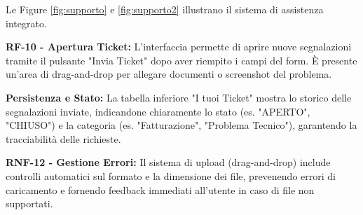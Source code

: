 Le Figure \ref{fig:supporto} e \ref{fig:supporto2} illustrano il sistema di assistenza integrato.

\textbf{RF-10 - Apertura Ticket:}
L'interfaccia permette di aprire nuove segnalazioni tramite il pulsante "Invia Ticket" dopo aver riempito i campi del form. È presente un'area di drag-and-drop per allegare documenti o screenshot del problema.

\textbf{Persistenza e Stato:}
La tabella inferiore "I tuoi Ticket" mostra lo storico delle segnalazioni inviate, indicandone chiaramente lo stato (es. "APERTO", "CHIUSO") e la categoria (es. "Fatturazione", "Problema Tecnico"), garantendo la tracciabilità delle richieste.

\textbf{RNF-12 - Gestione Errori:}
Il sistema di upload (drag-and-drop) include controlli automatici sul formato e la dimensione dei file, prevenendo errori di caricamento e fornendo feedback immediati all'utente in caso di file non supportati.